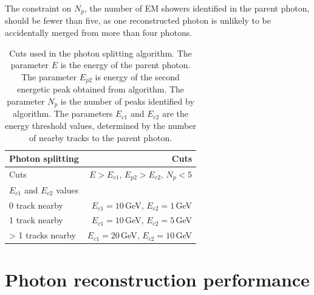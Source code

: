 
The constraint on $N_{p}$, the number of EM showers identified in the parent photon, should be fewer than five, as one reconstructed photon is unlikely to be accidentally merged from more than four photons.


\begin{table}[htbp]
\centering
\smallskip
\begin{tabular}{l r }
\hline
\hline
Photon splitting&  Cuts\\
\hline
\multicolumn{1}{L{0.3\textwidth}}{Cuts} & \multicolumn{1}{R{0.6\textwidth}}{$E > E_{c1}$, $E_{p2} > E_{c2}$, $N_{p} < 5$} \\
\hline
$E_{c1}$ and $E_{c2}$ values &  \\
\hline
\multicolumn{1}{L{0.3\textwidth}}{0 track nearby} & \multicolumn{1}{R{0.6\textwidth}}{$E_{c1} = 10$\,GeV, $E_{c2} = 1$\,GeV} \\
\multicolumn{1}{L{0.3\textwidth}}{1 track nearby} & \multicolumn{1}{R{0.6\textwidth}}{$E_{c1} = 10$\,GeV, $E_{c2} = 5$\,GeV} \\
\multicolumn{1}{L{0.3\textwidth}}{> 1 tracks nearby} & \multicolumn{1}{R{0.6\textwidth}}{$E_{c1} = 20$\,GeV, $E_{c2} = 10$\,GeV} \\
\hline
\hline
\end{tabular}

\caption[Cuts for splitting photons.]%
{Cuts used in the photon splitting algorithm. The parameter $E$ is the energy of the parent photon. The parameter $E_{p2}$ is  energy of the second energetic peak obtained from \peakFinding algorithm. The parameter $N_{p}$ is the number of peaks identified by \peakFinding algorithm. The parameters $E_{c1}$ and $E_{c2}$ are the energy threshold values, determined by the number of nearby tracks to the parent photon.}
\label{tab:photonPhotonSplitting}
\end{table}

\section{Photon reconstruction performance}



